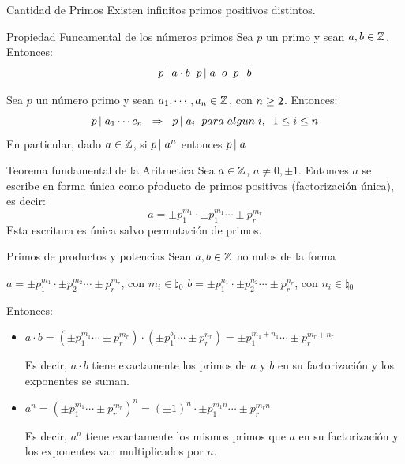 \documentclass[10pt]{article}
\begin{document}
\begin{cor}{Cantidad de Primos}
Existen infinitos primos positivos distintos.
\end{cor}

\begin{teo}{Propiedad Funcamental de los números primos}
 Sea $p$ un primo y sean $a,b \in \entero{}$. Entonces:
 \[\divi{p}{a \cdot b} \es{0.2} \divi{p}{a} \es{0.2} o \es{0.2} \divi{p}{b}\]
\end{teo}

\begin{propo}{}
 Sea $p$ un número primo y sean $a_1, \cdots, a_n \in \entero{}$, con $n \mayig2$. Entonces:
 \[\divi{p}{a_1} \cdots c_n \es{0.2} \implica \es{0.2} \divi{p}{a_i}\es{0.2} para \es{0.1} algun \es{0.1} i, \es{0.2} 1 \menig i \menig n\]
 En particular, dado $a \in \entero{}$, si $\divi{p}{a^n}$ entonces $\divi{p}{a}$
\end{propo}

\begin{teo}{Teorema fundamental de la Aritmetica}
 Sea $a \in \entero{}$, $a \neq 0, \pm 1$. Entonces $a$ se escribe en forma única como pŕoducto de primos positivos (factorización única), es decir:
 \[a = \pm p_1^{m_1} \cdot \pm p_1^{m_1} \cdots \pm p_r^{m_r} \]
 Esta escritura es única salvo permutación de primos.
\end{teo}

\begin{obs}{Primos de productos y potencias}
Sean $a,b \in \entero{}$ no nulos de la forma 
\begin{center}
 $a = \pm p_1^{m_1} \cdot \pm p_2^{m_2} \cdots \pm p_r^{m_r}$, con $m_i \in \natural{}_0$
 $b = \pm p_1^{n_1} \cdot \pm p_2^{n_2} \cdots \pm p_r^{n_r}$, con $n_i \in \natural{}_0$
 \end{center}
 Entonces:
 \begin{itemize}
  \item $a \cdot b = (\pm p_1^{m_1}  \cdots \pm p_r^{m_r}) \cdot (\pm p_1^{b_1}  \cdots \pm p_r^{n_r}) = \pm p_1^{m_1 + n_1}  \cdots \pm p_r^{m_r + n_r}$
  
  Es decir, $a \cdot b$ tiene exactamente los primos de $a$ y $b$ en su factorización y los exponentes se suman.
  \item $a^n = (\pm p_1^{m_1}  \cdots \pm p_r^{m_r})^n = (\pm 1)^n \cdot \pm p_1^{m_1 n}  \cdots \pm p_r^{m_r n}$
  
  Es decir, $a^n$ tiene exactamente los mismos primos que $a$ en su factorización y los exponentes van multiplicados por $n$.
 \end{itemize}
\end{obs}
\end{document}
